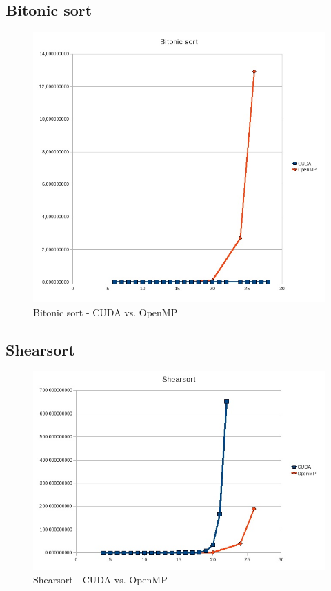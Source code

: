 \documentclass[12pt]{article}
\begin{document}
\subsection{Bitonic sort}
\begin{figure}[H]
\begin{center}
\includegraphics[width=14cm]{bit-cudavsomp.jpg}
\caption{Bitonic sort - CUDA vs. OpenMP}
\label{fig:bit-cuda-vs-omp}
\end{center}
\end{figure}

\subsection{Shearsort}
\begin{figure}[H]
\begin{center}
\includegraphics[width=14cm]{shear-cudavsomp.jpg}
\caption{Shearsort - CUDA vs. OpenMP}
\label{fig:shear-cuda-vs-omp}
\end{center}
\end{figure}
\end{document}
